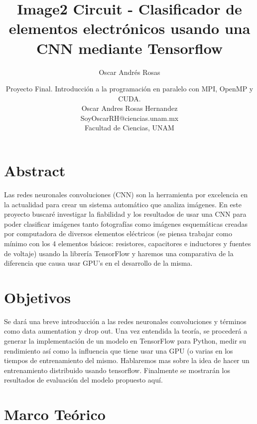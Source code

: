 \documentclass[10pt, fleqn, journal]{IEEEtran}
\author{Oscar Andrés Rosas}                                     %
\theoremstyle{break}                                            %
\begin{document}
  \title{
    \textbf{Image2 Circuit}
     - Clasificador de elementos electrónicos usando una CNN mediante Tensorflow
  }

  \author{
    Proyecto Final. Introducción a la programación en paralelo con MPI, OpenMP y CUDA. \\[0.2in]
    Oscar Andres Rosas Hernandez \\
    SoyOscarRH@ciencias.unam.mx \\
    Facultad de Ciencias, UNAM
  }


  \maketitle

  \section*{Abstract}

  Las redes neuronales convoluciones (CNN) son la herramienta por excelencia en la actualidad para crear un
  sistema automático que analiza imágenes.
  En este proyecto buscaré investigar la fiabilidad y los resultados de usar una CNN para poder clasificar imágenes
  tanto fotografías como imágenes esquemáticas creadas por computadora de diversos elementos eléctricos
  (se piensa trabajar como mínimo con los 4 elementos básicos: resistores, capacitores e inductores y fuentes de voltaje)
  usando la librería TensorFlow y haremos una comparativa de
  la diferencia que causa usar GPU's en el desarrollo de la misma.
  
  \section{Objetivos}
  
    Se dará una breve introducción a las redes neuronales convoluciones y términos como data aumentation y drop out.
    Una vez entendida la teoría, se procederá a generar la implementación de un modelo en TensorFlow para Python, medir
    su rendimiento así como la influencia que tiene usar una GPU (o varias en los tiempos de entrenamiento del mismo.
    Hablaremos mas sobre la idea de hacer un entrenamiento distribuido usando tensorflow.
    Finalmente se mostrarán los resultados de evaluación del modelo propuesto aquí.

    \section{Marco Teórico}
    
\end{document}
